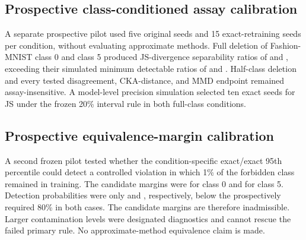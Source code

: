 \subsection{Prospective class-conditioned assay calibration}
A separate prospective pilot used five original seeds and 15 exact-retraining seeds
per condition, without evaluating approximate methods. Full deletion of Fashion-MNIST
class 0 and class 5 produced JS-divergence separability ratios of
\PhaseThreeClassZeroJSRatio{} and \PhaseThreeClassFiveJSRatio{}, exceeding their
simulated minimum detectable ratios of \PhaseThreeClassZeroMinimum{} and
\PhaseThreeClassFiveMinimum{}. Half-class deletion and every tested disagreement,
CKA-distance, and MMD endpoint remained assay-insensitive. A model-level precision
simulation selected ten exact seeds for JS under the frozen 20\% interval rule in both
full-class conditions.

\subsection{Prospective equivalence-margin calibration}
A second frozen pilot tested whether the condition-specific exact/exact 95th percentile
could detect a controlled violation in which 1\% of the forbidden class remained in
training. The candidate margins were \PhaseThreeClassZeroMargin{} for class 0 and
\PhaseThreeClassFiveMargin{} for class 5. Detection probabilities were only
\PhaseThreeClassZeroDetection{} and \PhaseThreeClassFiveDetection{}, respectively,
below the prospectively required 80\% in both cases. The candidate margins are therefore
inadmissible. Larger contamination levels were designated diagnostics and cannot rescue
the failed primary rule. No approximate-method equivalence claim is made.
